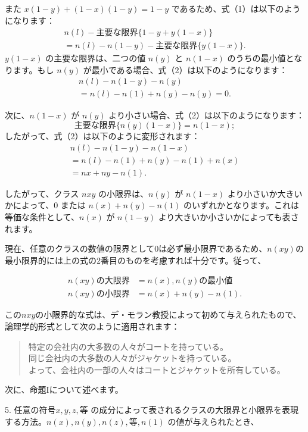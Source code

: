 \documentclass[a4paper,11pt,openany]{ltjsbook}
\begin{document}
また \( x(1-y) + (1-x)(1-y) = 1-y \) であるため、式（1）は以下のようになります：
\[
\begin{split}
n(l) - \text{主要な限界}\{1-y + y(1-x)\} \\
= n(l) - n(1-y) - \text{主要な限界}\{y(1-x)\}.  %
\end{split}
\]
\( y(1-x) \) の主要な限界は、二つの値 \( n(y) \) と \( n(1-x) \) のうちの最小値となります。もし \( n(y) \) が最小である場合、式（2）は以下のようになります：
\[
\begin{split}
n(l) - n(1-y) - n(y) \\
= n(l) - n(1) + n(y) - n(y) = 0.
\end{split}
\]

次に、\( n(1-x) \) が \( n(y) \) より小さい場合、式（2）は以下のようになります：
\[
\text{主要な限界}\{n(y)(1-x)\} = n(1-x);
\]
したがって、式（2）は以下のように変形されます：
\begin{gather*}
n(l) - n(1-y) - n(1-x) \\
= n(l) - n(1) + n(y) - n(1) + n(x) \\
= nx + ny - n(1).
\end{gather*}

したがって、クラス \( nxy \) の小限界は、\( n(y) \) が \( n(1-x) \) より小さいか大きいかによって、0 または \( n(x) + n(y) - n(1) \) のいずれかとなります。これは等価な条件として、\( n(x) \) が \( n(1-y) \) より大きいか小さいかによっても表されます。

現在、任意のクラスの数値の限界として$0$は必ず最小限界であるため、$n(xy)$の最小限界的には上の式の2番目のものを考慮すれば十分です。従って、

\begin{align*}
  n(xy) の大限界 &= n(x), n(y) の最小値 \\
  n(xy) の小限界 &= n(x) + n(y) - n(1).
\end{align*}

この$nxy$の小限界的な式は、デ・モラン教授によって初めて与えられたもので、論理学的形式として次のように適用されます：

\begin{verse}
  特定の会社内の大多数の人々がコートを持っている。\\
  同じ会社内の大多数の人々がジャケットを持っている。\\
  よって、会社内の一部の人々はコートとジャケットを所有している。
\end{verse}

次に、命題Iについて述べます。

5. 任意の符号$x, y, z, 等$ の成分によって表されるクラスの大限界と小限界を表現する方法。$n(x), n(y), n(z), 等, n(1)$ の値が与えられたとき、
\end{document}
